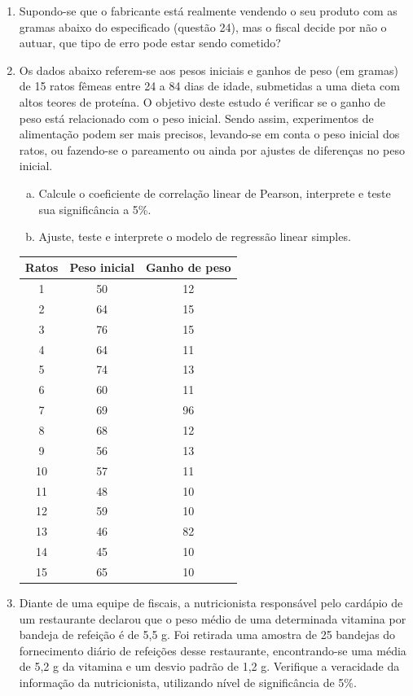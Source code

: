 \documentclass[12pt, a4paper]{article}
\begin{document}
\begin{enumerate}
\item Supondo-se que o fabricante está realmente vendendo o seu produto com as gramas abaixo do especificado (questão 24), mas o fiscal decide por não o autuar, que tipo de erro pode estar sendo cometido?

\item Os dados abaixo referem-se aos pesos iniciais e ganhos de peso (em gramas) de 15 ratos fêmeas entre 24 a 84 dias de idade, submetidas a uma dieta com altos teores de proteína. O objetivo deste estudo é verificar se o ganho de peso está relacionado com o peso inicial. Sendo assim, experimentos de alimentação podem ser mais precisos, levando-se em conta o peso inicial dos ratos, ou fazendo-se o pareamento ou ainda por ajustes de diferenças no peso inicial.
\begin{enumerate}[a)]
    \item Calcule o coeficiente de correlação linear de Pearson, interprete e teste sua significância a 5\%.
    \item Ajuste, teste e interprete o modelo de regressão linear simples.
\end{enumerate}
\begin{center}
\begin{tabular}{|c|c|c|}
\hline
\textbf{Ratos} & \textbf{Peso inicial} & \textbf{Ganho de peso} \\
\hline
1 & 50 & 12 \\
2 & 64 & 15 \\
3 & 76 & 15 \\
4 & 64 & 11 \\
5 & 74 & 13 \\
6 & 60 & 11 \\
7 & 69 & 96 \\
8 & 68 & 12 \\
9 & 56 & 13 \\
10 & 57 & 11 \\
11 & 48 & 10 \\
12 & 59 & 10 \\
13 & 46 & 82 \\
14 & 45 & 10 \\
15 & 65 & 10 \\
\hline
\end{tabular}
\end{center}

\item Diante de uma equipe de fiscais, a nutricionista responsável pelo cardápio de um restaurante declarou que o peso médio de uma determinada vitamina por bandeja de refeição é de 5,5 g. Foi retirada uma amostra de 25 bandejas do fornecimento diário de refeições desse restaurante, encontrando-se uma média de 5,2 g da vitamina e um desvio padrão de 1,2 g. Verifique a veracidade da informação da nutricionista, utilizando nível de significância de 5\%.


\end{enumerate}
\end{document}
